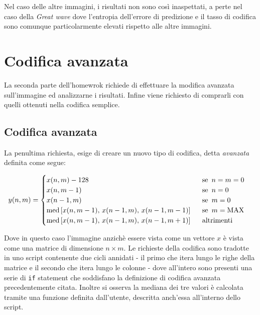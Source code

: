 Nel caso delle altre immagini, i risultati non sono così inaspettati, a perte nel caso della \textsl{Great wave} dove l'entropia dell'errore di predizione e il tasso di codifica sono comunque particolarmente elevati rispetto alle altre immagini.





\newpage\section{Codifica avanzata}
La seconda parte dell'homewrok richiede di effettuare la modifica avanzata sull'immagine ed analizzarne i risultati. Infine viene richiesto di comprarli con quelli ottenuti nella codifica semplice.


\vspace{15px}\subsection{Codifica avanzata}

La penultima richiesta, esige di creare un nuovo tipo di codifica, detta \textsl{avanzata} definita come segue:

\begin{gather*}
    y(n, m) = 
    \begin{cases}
        x(n, m) - 128 \hspace{161px} \text{se } \, n = m = 0 \\
        x(n, m - 1) \hspace{171px} \text{se } \, n = 0\\
        x(n - 1, m) \hspace{171px} \text{se } \, m = 0\\
        \text{med}\left[ x(n, m - 1),\, x(n - 1, m),\, x(n - 1, m - 1) \right] \hspace{15px} \text{se } \, m = \text{MAX}\\
        \text{med}\left[ x(n, m - 1),\, x(n - 1, m),\, x(n - 1, m + 1) \right] \hspace{15px} \text{altrimenti}
    \end{cases}
\end{gather*} 

\noindent Dove in questo caso l'immagine anzichè essere vista come un vettore $x$ è vista come una matrice di dimensione $n \times m$. Le richieste della codifica sono tradotte in uno script contenente due cicli annidati - il primo che itera lungo le righe della matrice e il secondo che itera lungo le colonne - dove all'intero sono presenti una serie di \texttt{if} statement che soddisfano la definizione di codifica avanzata precedentemente citata. Inoltre si osserva la mediana dei tre valori è calcolata tramite una funzione definita dall'utente, descritta anch'essa all'interno dello script. 

